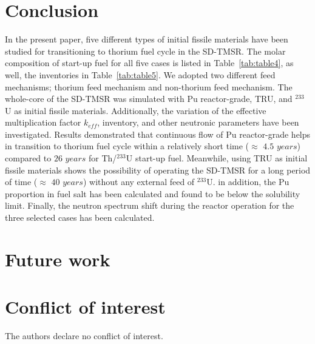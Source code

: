\section{Conclusion}

In the present paper, five different types of initial fissile materials have been studied for transitioning to thorium fuel cycle in the \gls{SD-TMSR}. The molar composition of start-up fuel for all five cases is listed in Table~\ref{tab:table4}, as well, the inventories in Table~\ref{tab:table5}. We adopted two different feed mechanisms; thorium feed mechanism and non-thorium feed mechanism. The whole-core of the SD-TMSR was simulated with Pu reactor-grade, TRU, and $^{233}$U as initial fissile materials. Additionally, the variation of the effective multiplication factor $k_{eff}$, inventory, and other neutronic parameters have been investigated. Results demonstrated that continuous flow of Pu reactor-grade helps in transition to thorium fuel cycle within a relatively short time ($\approx$ $4.5$ $years$) compared to $26$ $years$ for Th/$^{233}$U start-up fuel. Meanwhile, using \gls{TRU} as initial fissile materials shows the possibility of operating the SD-TMSR for a long period of time ($\approx$ $40$ $years$) without any external feed of $^{233}$U. in addition, the Pu proportion in fuel salt has been calculated and found to be below the solubility limit. Finally, the neutron spectrum shift during the reactor operation for the three selected cases has been calculated.

\section{Future work}


\section{Conflict of interest}

The authors declare no conflict of interest. 
